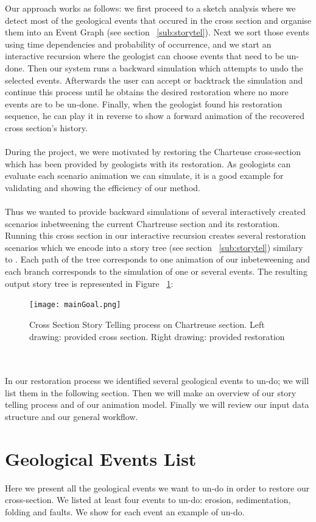 \documentclass[12pt, a4paper]{report} %
\begin{document}
Our approach works as follows: we first proceed to a sketch analysis where we detect most of the geological events that occured in the cross section and organise them into an Event Graph (see section ~\ref{sub:storytel}).
Next we sort those events using time dependencies and probability of occurrence, and we start an interactive recursion where the geologist can choose events that need to be un-done. Then our system runs a backward simulation which attempts to undo the selected events. Afterwards the user can accept or backtrack the simulation and continue this process until he obtains the desired restoration where no more events are to be un-done.
Finally, when the geologist found his restoration sequence, he can play it in reverse to show a forward animation of the recovered cross section's history.\\\\
During the project, we were motivated by restoring the Charteuse cross-section which has been provided by geologists with its restoration. As geologists can evaluate each scenario animation we can simulate, it is a good example for validating and showing the efficiency of our method.\\\\
Thus we wanted to provide backward simulations of several interactively created scenarios inbetweening the current Chartreuse section and its restoration. Running this cross section in our interactive recursion creates several restoration scenarios which we encode into a story tree (see section ~\ref{sub:storytel}) similary to \cite{lidal}. Each path of the tree corresponds to one animation of our inbeteweening and each branch corresponds to the simulation of one or several events. The resulting output story tree is represented in Figure ~\ref{maingoal}:
 \begin{figure}[H]
	\centering
	\texttt{[image: mainGoal.png]}
	\caption{Cross Section Story Telling process on Chartreuse section. Left drawing: provided cross section. Right drawing: provided restoration}
	\label{maingoal}
\end{figure}\\\\
In our restoration process we identified several geological events to un-do; we will list them in the following section.
Then we will make an overview of our story telling process and of our animation model. Finally we will review our input data structure and our general workflow.

\section{Geological Events List}
Here we present all the geological events we want to un-do in order to restore our cross-section.
We listed at least four events to un-do: erosion, sedimentation, folding and faults. We show for each event an example of un-do.
\end{document}

